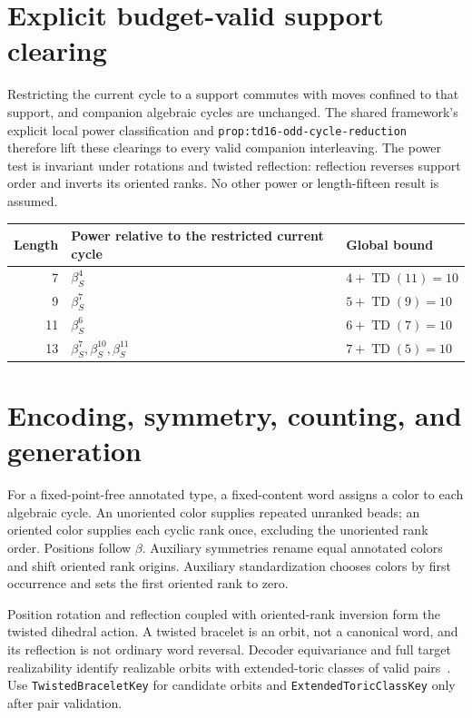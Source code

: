 \documentclass[11pt,a4paper]{article}
\newcommand{\TD}{\operatorname{TD}}
\begin{document}
\section{Explicit budget-valid support clearing}
Restricting the current cycle to a support commutes with moves confined to that
support, and companion algebraic cycles are unchanged. The shared framework's
explicit local power classification and
\nolinkurl{prop:td16-odd-cycle-reduction}~\cite{framework} therefore lift these
clearings to every valid companion interleaving. The power test is invariant
under rotations and twisted reflection: reflection reverses support order and
inverts its oriented ranks. No other power or length-fifteen result is assumed.
\begin{center}\begin{tabular}{@{}rll@{}}\toprule
Length & Power relative to the restricted current cycle & Global bound\\\midrule
7 & $\beta_S^4$ & $4+\TD(11)=10$\\
9 & $\beta_S^7$ & $5+\TD(9)=10$\\
11 & $\beta_S^6$ & $6+\TD(7)=10$\\
13 & $\beta_S^7,\beta_S^{10},\beta_S^{11}$ & $7+\TD(5)=10$\\
\bottomrule\end{tabular}\end{center}

\section{Encoding, symmetry, counting, and generation}
For a fixed-point-free annotated type, a fixed-content word assigns a color to
each algebraic cycle. An unoriented color supplies repeated unranked beads;
an oriented color supplies each cyclic rank once, excluding the unoriented
rank order. Positions follow $\beta$. Auxiliary symmetries rename equal
annotated colors and shift oriented rank origins. Auxiliary standardization
chooses colors by first occurrence and sets the first oriented rank to zero.

Position rotation and reflection coupled with oriented-rank inversion form the
twisted dihedral action. A twisted bracelet is an orbit, not a canonical word,
and its reflection is not ordinary word reversal. Decoder equivariance and full
target realizability identify realizable orbits with extended-toric classes of
valid pairs~\cite{framework}. Use \nolinkurl{TwistedBraceletKey} for candidate
orbits and \nolinkurl{ExtendedToricClassKey} only after pair validation.
\end{document}
